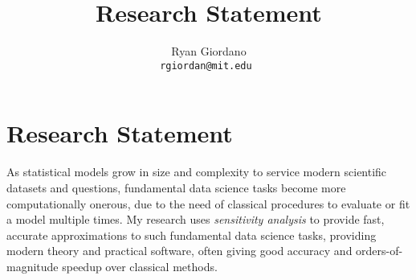 

\usepackage{enumitem}

\title{Research Statement}

\author{
  Ryan Giordano \\ \texttt{rgiordan@mit.edu }
}



\section*{Research Statement}

As statistical models grow in size and complexity to service modern scientific
datasets and questions, fundamental data science tasks become more
computationally onerous, due to the need of classical procedures to evaluate or
fit a model multiple times.  My research uses {\em sensitivity analysis} to
provide fast, accurate approximations to such fundamental data science tasks,
providing modern theory and practical software, often giving good accuracy and
orders-of-magnitude speedup over classical methods.

